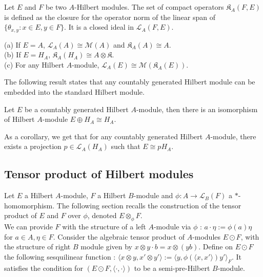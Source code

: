 \begin{definition}
Let $E$ and $F$ be two $A$-Hilbert modules. The set of compact operators $\mathfrak K_A(F,E)$ is defined as the closure for the operator norm of the linear span of $\{\theta_{x,y} : x\in E,y\in F\}$. It is a closed ideal in $\mathcal L_A(F,E)$.\cite{Lance}
\end{definition}

\begin{Expl}
(a) If $E=A$, $\mathcal L_A(A) \cong \mathcal M (A)$ and $\mathfrak K_A(A) \cong A$.\\
(b) If $E=H_A$, $\mathfrak K_A(H_A) \cong A\otimes \mathfrak K$.\\
(c) For any Hilbert $A$-module, $\mathcal L_A(E) \cong \mathcal M(\mathfrak K_A(E))$.
\end{Expl}

The following result states that any countably generated Hilbert module can be embedded into the standard Hilbert module.

\begin{thm}[Stabilization]
Let $E$ be a countably generated Hilbert $A$-module, then there is an isomorphism of Hilbert $A$-module $E\oplus H_A \cong H_A$.
\end{thm}

As a corollary, we get that for any countably generated Hilbert $A$-module, there exists a projection $p\in \mathcal L_A(H_A)$ such that $E\cong p H_A$.

\subsection{Tensor product of Hilbert modules}

Let $E$ a Hilbert $A$-module, $F$ a Hilbert $B$-module and $\phi : A \rightarrow \mathcal L_B(F)$ a $*$-homomorphism. The following section recalls the construction of the tensor product of $E$ and $F$ over $\phi$, denoted $E\otimes_\phi F$.\\

We can provide $F$ with the structure of a left $A$-module via $\phi$ : $a\cdot \eta := \phi(a)\eta$ for $a\in A,\eta\in F$. Consider the algebraic tensor product of $A$-modules $E\odot F$, with the structure of right $B$ module given by $x\otimes y \cdot b = x\otimes (yb)$. Define on $E\odot F$ the following sesquilinear function : $\langle x \otimes y , x'\otimes y'\rangle := \langle y, \phi(\langle x, x'\rangle)y'\rangle_F $. It satisfies the condition for $(E\odot F,\langle \cdot , \cdot \rangle )$ to be a semi-pre-Hilbert $B$-module.

